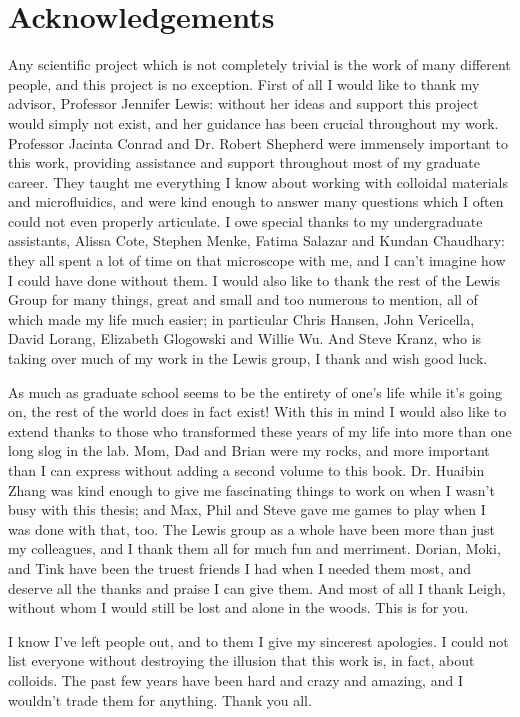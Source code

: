 \chapter*{Acknowledgements}

Any scientific project which is not completely trivial is the work
of many different people, and this project is no exception.  
First of all I would like to thank my advisor, Professor Jennifer
Lewis: without her ideas and support this project would simply
not exist, and her guidance has been crucial throughout my work.
Professor Jacinta Conrad and Dr.
Robert Shepherd were immensely important to this work, 
providing assistance and support throughout 
most of my graduate career.  They taught me everything I know 
about working with colloidal materials and microfluidics, and were
kind enough to answer many questions which I often could not even
properly articulate.  I owe special thanks to my undergraduate
assistants, Alissa Cote, Stephen Menke, Fatima Salazar and 
Kundan Chaudhary: they all spent a lot of time on that microscope
with me, and I can't imagine how I could have done without them.
I would also like to thank the rest of the Lewis Group for 
many things, great and small and too numerous to mention, all of
which made my life much easier; in particular Chris Hansen,
John Vericella, David Lorang, Elizabeth Glogowski and Willie Wu.
And Steve Kranz, who is taking over much of my work in the Lewis
group, I thank and wish good luck.

As much as graduate school seems to be the entirety of one's life
while it's going on, the rest of the world does in fact exist! 
With this in mind I would also like to extend thanks to those
who transformed these years of my life into more than one long 
slog in the lab. Mom, Dad and Brian were my rocks, and more important
than I can express without adding a second volume to this book.  
Dr. Huaibin Zhang was kind enough to give me fascinating things to
work on when I wasn't busy with this thesis; and Max, Phil and Steve
gave me games to play when I was done with that, too.  
The Lewis group as a whole have been more than just my colleagues,
and I thank them all for much fun and merriment. Dorian, Moki, 
and Tink have been the truest friends I had when I needed them most, 
and deserve all the thanks and praise I can give them.  And most of 
all I thank Leigh, without whom I would still be lost and alone in the
woods.  This is for you.

I know I've left people out, and to them I give my sincerest apologies.
I could not list everyone without destroying the illusion that this 
work is, in fact, about colloids.
The past few years have been hard and crazy and amazing, and I wouldn't trade them for
anything.  Thank you all.
